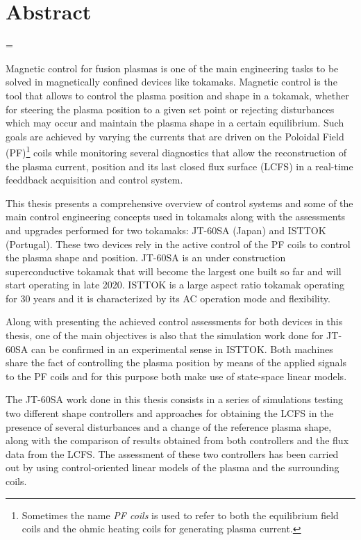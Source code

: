 \chapter*{Abstract}
\emergencystretch=\maxdimen
{}

Magnetic control for fusion plasmas is one of the main engineering tasks to be solved in magnetically  confined devices like tokamaks. Magnetic control is the tool that allows to control the plasma position and shape in a tokamak, whether  for steering the plasma position to a given set point or rejecting disturbances which may occur and maintain the plasma shape in a certain equilibrium. Such goals are achieved by varying the currents that are driven on the Poloidal Field (PF)\footnote{Sometimes the name \emph{PF coils} is used to refer to  both the equilibrium field coils and the ohmic heating coils for generating plasma current.} coils while monitoring several diagnostics that allow the reconstruction of the plasma current, position and its last closed flux surface (LCFS) in a real-time feeddback acquisition and control system.
\smallskip

This thesis presents a comprehensive overview of control systems and some of the main control engineering concepts used in tokamaks along with  the assessments and upgrades performed for two tokamaks: JT-60SA (Japan) and ISTTOK (Portugal). These two devices rely in the active control of the PF coils to control the plasma shape and position. JT-60SA is an under construction superconductive tokamak that will become the largest one built so far and will start operating in late 2020. ISTTOK is a large aspect ratio tokamak operating for 30 years and it is characterized by its AC operation mode and flexibility. \smallskip

 Along with presenting the achieved control assessments for both devices in this thesis, one of the main objectives  is also that the simulation work done for JT-60SA can be confirmed in an experimental sense in ISTTOK. Both machines share the fact of controlling the plasma position by means of the applied signals to the PF coils and for this purpose both make use of state-space linear models.  \smallskip

 
The JT-60SA work done in this thesis consists in a series of simulations testing two different shape controllers and  approaches for obtaining the LCFS  in the presence of several disturbances and a change of the reference plasma shape, along with the comparison of results obtained from both controllers and the flux data from the LCFS.   The assessment of these two controllers has been carried out by using control-oriented linear models of the plasma and the surrounding coils.\smallskip


